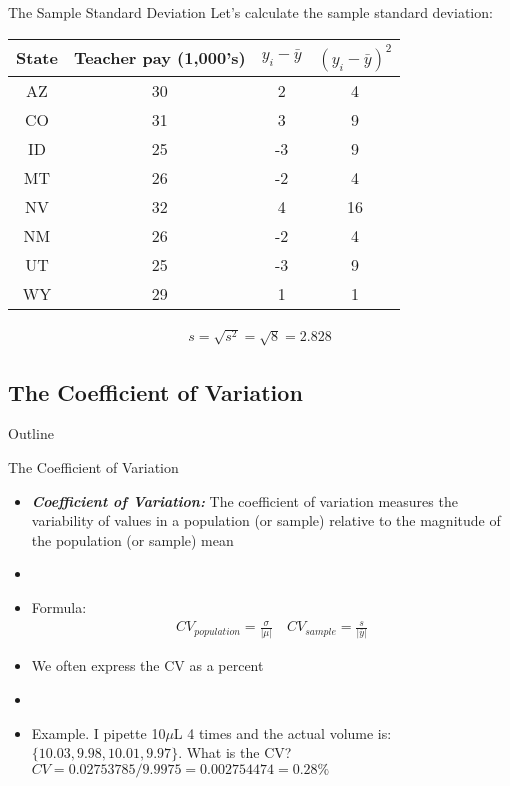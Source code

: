 \documentclass[xcolor=dvipsnames]{beamer}
\begin{document}
\begin{frame}{The Sample Standard Deviation}
	Let's calculate the sample standard deviation:
	\begin{center}
		\begin{tabular}{|c|c|c|c|}
			\hline 
			\textbf{State} & \textbf{Teacher pay (1,000's)} &  $y_i-\bar{y}$ & $(y_i-\bar{y})^2$\\ 
			\hline \hline
			AZ & 30 & 2 &4\\ \hline 
			CO &  31 & 3 &9\\ \hline 
			ID & 25  & -3 &9\\  \hline 
			MT &  26 & -2 &4\\ \hline 
			NV & 32 & 4 &16\\ \hline 
			NM &  26 & -2 &4\\ \hline 
			UT &  25 & -3 &9\\ \hline 
			WY &  29 & 1 &1\\ \hline 
		\end{tabular} 
	\end{center}
	\begin{gather*}
	s = \sqrt{s^2} = \sqrt{8} = 2.828
	\end{gather*}
\end{frame}

\subsection{The Coefficient of Variation}
\begin{frame}{Outline}
	\tableofcontents[currentsection,subsectionstyle=show/shaded/hide]
\end{frame}

\begin{frame}{The Coefficient of Variation}
	\begin{itemize}
		\item \textbf{\emph{Coefficient of Variation:}} The coefficient of variation measures the variability of values in a population (or sample) relative to the magnitude of the population (or sample) mean 
		\item[]
		\item Formula:
		\begin{align*}
			CV_{population} = \frac{\sigma}{|\mu|} \quad CV_{sample} = \frac{s}{|\bar{y}|}
		\end{align*}
		\item We often express the CV as a percent
		\item[]
		\item Example. I pipette 10$\mu$L 4 times and the actual volume is: $\{10.03, 9.98, 10.01, 9.97\}$. What is the CV? $CV = 0.02753785 / 9.9975 = 0.002754474 = 0.28 \%$
	\end{itemize}
\end{frame}
\end{document}
